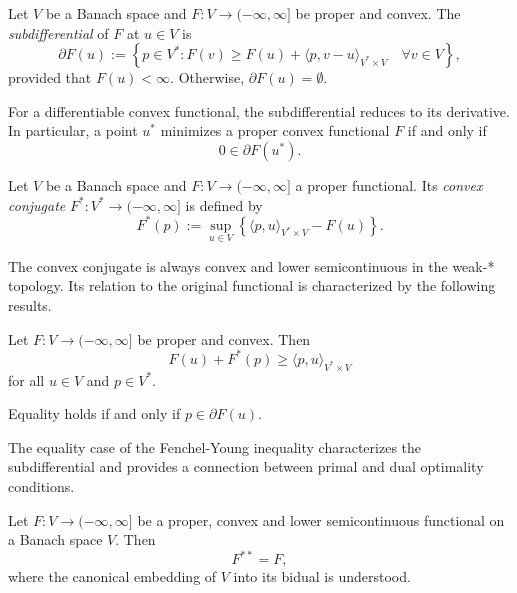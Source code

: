\begin{definition}[Subdifferential]
    Let $V$ be a Banach space and
    $F:V\to(-\infty,\infty]$ be proper
    and convex. The \emph{subdifferential}
    of $F$ at $u\in V$ is
    \[
        \partial F(u):=
        \left\{
            p\in V^*:
            F(v)\geq F(u)
            +\langle p,v-u\rangle_{V^*\times V}
            \quad\forall v\in V
        \right\},
    \]
    provided that $F(u)<\infty$.
    Otherwise, $\partial F(u)=\emptyset$.
\end{definition}

For a differentiable convex functional,
the subdifferential reduces to its derivative.
In particular, a point $u^*$ minimizes
a proper convex functional $F$ if and
only if
\[
    0\in\partial F(u^*).
\]

\begin{definition}
    Let $V$ be a Banach space and
    $F:V\to(-\infty,\infty]$ a proper
    functional. Its \emph{convex conjugate}
    $F^*:V^*\to(-\infty,\infty]$ is defined by
    \[
        F^*(p):=
        \sup_{u\in V}
        \left\{
            \langle p,u\rangle_{V^*\times V}
            -F(u)
        \right\}.
    \]
\end{definition}
The convex conjugate is always convex and
lower semicontinuous in the weak-* topology.
Its relation to the original functional is
characterized by the following results.
\begin{theorem}
    Let $F:V\to(-\infty,\infty]$ be proper
    and convex. Then
    \[
        F(u)+F^*(p)
        \geq \langle p,u\rangle_{V^*\times V}
    \]
    for all $u\in V$ and $p\in V^*$.

    Equality holds if and only if
    $p\in\partial F(u)$.
\end{theorem}
The equality case of the Fenchel-Young inequality characterizes the subdifferential and provides a connection between primal and dual optimality conditions.
\begin{theorem}
    Let $F:V\to(-\infty,\infty]$ be a
    proper, convex and lower semicontinuous
    functional on a Banach space $V$.
    Then
    \[
        F^{**}=F,
    \]
    where the canonical embedding of
    $V$ into its bidual is understood.
\end{theorem}

